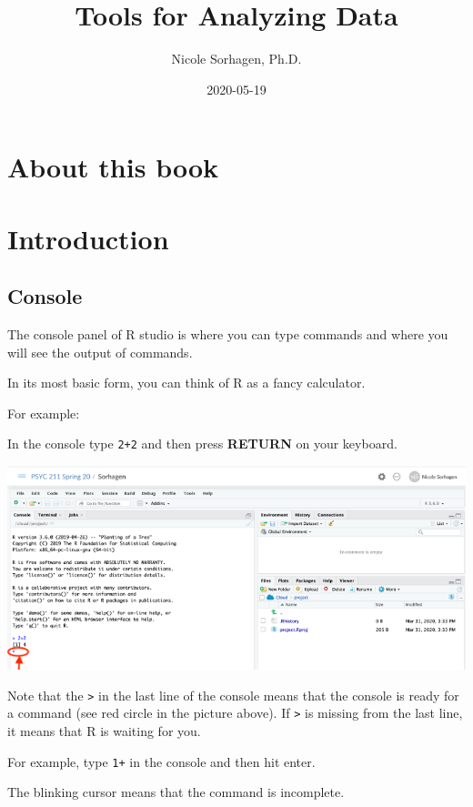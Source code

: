 \documentclass[]{book}
\title{Tools for Analyzing Data}
\author{Nicole Sorhagen, Ph.D.}
\date{2020-05-19}
\begin{document}
\maketitle

{
\setcounter{tocdepth}{1}
\tableofcontents
}
\hypertarget{about-this-book}{%
\chapter{About this book}\label{about-this-book}}

\hypertarget{introduction}{%
\chapter{Introduction}\label{introduction}}

\hypertarget{console}{%
\section{Console}\label{console}}

The console panel of R studio is where you can type commands and where you will see the output of commands.

In its most basic form, you can think of R as a fancy calculator.

For example:

In the console type \texttt{2+2} and then press \textbf{RETURN} on your keyboard.

\includegraphics{img/twoplus.png}

Note that the \texttt{\textgreater{}} in the last line of the console means that the console is ready for a command (see red circle in the picture above). If \texttt{\textgreater{}} is missing from the last line, it means that R is waiting for you.

For example, type \texttt{1+} in the console and then hit enter.

The blinking cursor means that the command is incomplete.
\end{document}
